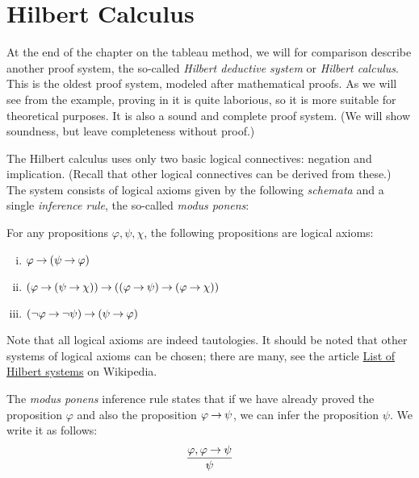\section{Hilbert Calculus}\label{section:hilbert-calculus-propositional}

At the end of the chapter on the tableau method, we will for comparison describe another proof system, the so-called \emph{Hilbert deductive system} or \emph{Hilbert calculus}. This is the oldest proof system, modeled after mathematical proofs. As we will see from the example, proving in it is quite laborious, so it is more suitable for theoretical purposes. It is also a sound and complete proof system. (We will show soundness, but leave completeness without proof.)

The Hilbert calculus uses only two basic logical connectives: negation and implication. (Recall that other logical connectives can be derived from these.) The system consists of logical axioms given by the following \emph{schemata} and a single \emph{inference rule}, the so-called \emph{modus ponens}:

\begin{definition}
For any propositions $\varphi, \psi, \chi$, the following propositions are logical axioms:
\begin{enumerate}[(i)]
    \item $\varphi \mathbin{\rightarrow} (\psi \mathbin{\rightarrow} \varphi)$
    \item $(\varphi \mathbin{\rightarrow} (\psi \mathbin{\rightarrow} \chi)) \mathbin{\rightarrow} ((\varphi \mathbin{\rightarrow} \psi) \mathbin{\rightarrow} (\varphi \mathbin{\rightarrow} \chi))$
    \item $(\neg \varphi \mathbin{\rightarrow} \neg \psi) \mathbin{\rightarrow} (\psi \mathbin{\rightarrow} \varphi)$
\end{enumerate}        
\end{definition}

Note that all logical axioms are indeed tautologies. It should be noted that other systems of logical axioms can be chosen; there are many, see the article \href{https://en.wikipedia.org/wiki/List_of_Hilbert_systems}{List of Hilbert systems} on Wikipedia.

\begin{definition}
The \emph{modus ponens} inference rule states that if we have already proved the proposition $\varphi$ and also the proposition $\varphi \mathbin{\rightarrow} \psi$, we can infer the proposition $\psi$. We write it as follows:
$$
\frac{\varphi, \varphi \mathbin{\rightarrow} \psi}{\psi}
$$ 
\end{definition}

